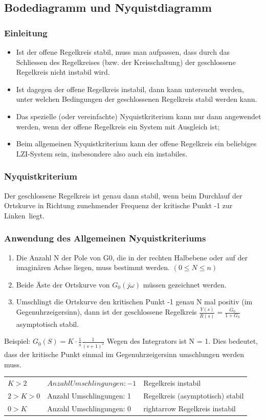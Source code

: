 \subsection{Bodediagramm und Nyquistdiagramm}
\subsubsection{Einleitung}
\begin{itemize}
	\item Ist der offene Regelkreis stabil, muss man aufpassen, dass durch das Schliessen
	des Regelkreises (bzw. der Kreisschaltung) der geschlossene Regelkreis nicht instabil
	wird.
	\item Ist dagegen der offene Regelkreis instabil, dann kann untersucht werden, unter
	welchen Bedingungen der geschlossenen Regelkreis stabil werden kann.
	\item Das
	spezielle (oder vereinfachte) Nyquistkriterium kann nur dann angewendet werden,
	wenn der offene Regelkreis ein System mit Ausgleich ist;
	\item Beim allgemeinen Nyquistkriterium
	kann der offene Regelkreis ein beliebiges LZI-System sein, insbesondere also auch
	ein instabiles.
\end{itemize}
\subsubsection{Nyquistkriterium}
		Der geschlossene Regelkreis ist genau dann stabil, wenn beim Durchlauf der
		Ortskurve in Richtung zunehmender Frequenz der kritische Punkt -1 \glqq zur
		Linken\grqq\ liegt.

\subsubsection{Anwendung des Allgemeinen Nyquistkriteriums}
\begin{enumerate}
\item Die Anzahl N der Pole von G0, die in der rechten Halbebene oder auf der
imaginären Achse liegen, muss bestimmt werden. $(0 \leq N \leq n)$
\item Beide Äste der Ortskurve von $G_0(j\omega)$ müssen gezeichnet werden.
\item Umschlingt die Ortskurve den kritischen Punkt -1 genau N mal positiv (im
Gegenuhrzeigersinn), dann ist der geschlossene Regelkreis 
$\frac{Y(s)}{R(s)} = \frac{G_0}{1+G_0}$ asymptotisch stabil.
\end{enumerate}
Beispiel: $G_0(S)= K\cdot\frac{1}{s}\frac{1}{(s+1)^2}$
Wegen des Integrators ist N = 1. Dies bedeutet, dass der kritische Punkt
einmal im Gegenuhrzeigersinn umschlungen werden muss.\\
\begin{tabularx}{\textwidth}{XXX}
$K > 2$ & $Anzahl Umschlingungen: -1$ & Regelkreis instabil \\
$2 > K > 0$ & Anzahl Umschlingungen: 1 & Regelkreis (asymptotisch) stabil\\
$0 >K$ & Anzahl Umschlingungen: 0 & rightarrow Regelkreis instabil\\
\end{tabularx}
